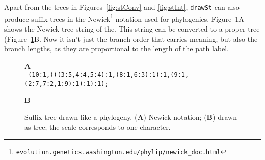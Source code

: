 Apart from the trees in Figures~\ref{fig:stConv} and \ref{fig:stInt},
\texttt{drawSt} can also produce suffix trees in the
Newick\footnote{\texttt{evolution.genetics.washington.edu/phylip/newick\_doc.html}}
notation used for phylogenies. Figure~\ref{fig:stNwk}A shows the
Newick tree string of the. This string can be converted to a proper
tree (Figure~\ref{fig:stNwk}B. Now it isn't just the branch order that
carries meaning, but also the branch lengths, as they are proportional
to the length of the path label.
\begin{figure}
  \begin{center}
    \textbf{A}\\
    \tt
    (10:1,(((3:5,4:4,5:4):1,(8:1,6:3):1):1,(9:1,(2:7,7:2,1:9):1):1):1);
  \end{center}
  \begin{center}
    \textbf{B}\\
    
  \end{center}
\caption{Suffix tree drawn like a phylogeny. (\textbf{A}) Newick
  notation; (\textbf{B}) drawn as tree; the scale corresponds to one character.}\label{fig:stNwk}
\end{figure}

